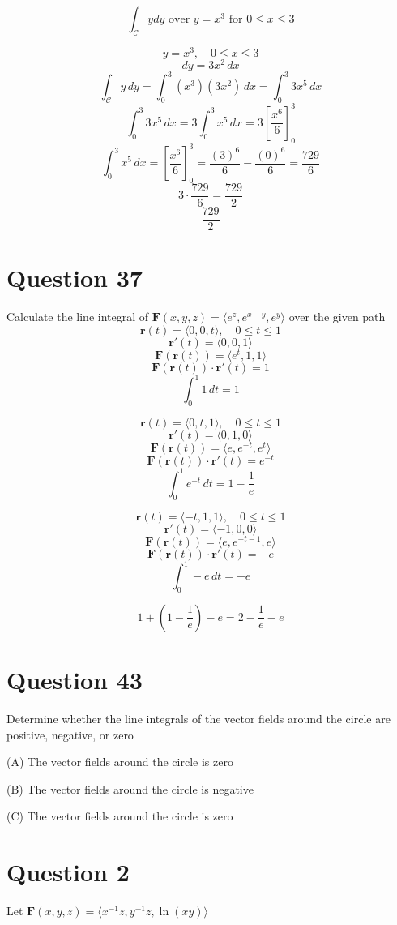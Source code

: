 \documentclass[hidelinks]{article}
\begin{document}
\[
    \int_\mathcal{C} ydy \text{ over } y = x^3 \text{ for }0 \leq x \leq 3
\]

\[
y = x^3, \quad 0 \leq x \leq 3
\]
\[
dy = 3x^2 \, dx
\]
\[
\int_\mathcal{C} y \, dy = \int_0^3 (x^3)(3x^2) \, dx = \int_0^3 3x^5 \, dx
\]
\[
\int_0^3 3x^5 \, dx = 3 \int_0^3 x^5 \, dx = 3 \left[ \frac{x^6}{6} \right]_0^3
\]
\[
\int_0^3 x^5 \, dx = \left[ \frac{x^6}{6} \right]_0^3 = \frac{(3)^6}{6} - \frac{(0)^6}{6} = \frac{729}{6} 
\]
\[
3 \cdot \frac{729}{6}  = \frac{729}{2}
\]
\[
\frac{729}{2}
\]
\newpage
\section*{Question 37}
Calculate the line integral of $\mathbf{F}(x,y,z) = \langle e^z, e^{x-y}, e^y \rangle$ over the given path
\[
\mathbf{r}(t) = \langle 0, 0, t \rangle, \quad 0 \leq t \leq 1
\]
\[
\mathbf{r}'(t) = \langle 0, 0, 1 \rangle
\]
\[
\mathbf{F}(\mathbf{r}(t)) = \langle e^t, 1, 1 \rangle
\]
\[
\mathbf{F}(\mathbf{r}(t)) \cdot \mathbf{r}'(t) = 1
\]
\[
\int_0^1 1 \, dt = 1
\]

\[
\mathbf{r}(t) = \langle 0, t, 1 \rangle, \quad 0 \leq t \leq 1
\]
\[
\mathbf{r}'(t) = \langle 0, 1, 0 \rangle
\]
\[
\mathbf{F}(\mathbf{r}(t)) = \langle e, e^{-t}, e^t \rangle
\]
\[
\mathbf{F}(\mathbf{r}(t)) \cdot \mathbf{r}'(t) = e^{-t}
\]
\[
\int_0^1 e^{-t} \, dt = 1 - \frac{1}{e}
\]

\[
\mathbf{r}(t) = \langle -t, 1, 1 \rangle, \quad 0 \leq t \leq 1
\]
\[ 
\mathbf{r}'(t) = \langle -1, 0, 0 \rangle
\]
\[
\mathbf{F}(\mathbf{r}(t)) = \langle e, e^{-t-1}, e \rangle
\]
\[
\mathbf{F}(\mathbf{r}(t)) \cdot \mathbf{r}'(t) = -e
\]
\[
\int_0^1 -e \, dt = -e
\]

\[
1 + \left(1 - \frac{1}{e}\right) - e = \boxed{2 - \frac{1}{e} - e}
\]
\newpage
\section*{Question 43}
Determine whether the line integrals of the vector fields around the circle are positive, negative, or zero

(A) The vector fields around the circle is zero 

(B) The vector fields around the circle is negative 

(C) The vector fields around the circle is zero

\newpage
\section*{Question 2}
Let $\mathbf{F}(x,y,z) = \langle x^{-1}z, y^{-1}z, \ln(xy) \rangle$
\end{document}
